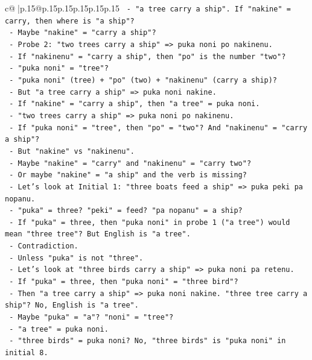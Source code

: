 \documentclass{article}
\begin{document}
{\begin{supertabular}{c@{$\;$}|p{.15\linewidth}@{}p{.15\linewidth}p{.15\linewidth}p{.15\linewidth}p{.15\linewidth}p{.15\linewidth}}
{{{\texttt{  {-} "a tree carry a ship". If "nakine" = carry, then where is "a ship"?} \\
\texttt{  {-} Maybe "nakine" = "carry a ship"?} \\
\texttt{  {-} Probe 2: "two trees carry a ship" => puka noni po nakinenu.} \\
\texttt{  {-} If "nakinenu" = "carry a ship", then "po" is the number "two"?} \\
\texttt{  {-} "puka noni" = "tree"?} \\
\texttt{  {-} "puka noni" (tree) + "po" (two) + "nakinenu" (carry a ship)?} \\
\texttt{  {-} But "a tree carry a ship" => puka noni nakine.} \\
\texttt{  {-} If "nakine" = "carry a ship", then "a tree" = puka noni.} \\
\texttt{  {-} "two trees carry a ship" => puka noni po nakinenu.} \\
\texttt{  {-} If "puka noni" = "tree", then "po" = "two"? And "nakinenu" = "carry a ship"?} \\
\texttt{  {-} But "nakine" vs "nakinenu".} \\
\texttt{  {-} Maybe "nakine" = "carry" and "nakinenu" = "carry two"?} \\
\texttt{  {-} Or maybe "nakine" = "a ship" and the verb is missing?} \\
\texttt{  {-} Let's look at Initial 1: "three boats feed a ship" => puka peki pa nopanu.} \\
\texttt{  {-} "puka" = three? "peki" = feed? "pa nopanu" = a ship?} \\
\texttt{  {-} If "puka" = three, then "puka noni" in probe 1 ("a tree") would mean "three tree"? But English is "a tree".} \\
\texttt{  {-} Contradiction.} \\
\texttt{  {-} Unless "puka" is not "three".} \\
\texttt{  {-} Let's look at "three birds carry a ship" => puka noni pa retenu.} \\
\texttt{  {-} If "puka" = three, then "puka noni" = "three bird"?} \\
\texttt{  {-} Then "a tree carry a ship" => puka noni nakine. "three tree carry a ship"? No, English is "a tree".} \\
\texttt{  {-} Maybe "puka" = "a"? "noni" = "tree"?} \\
\texttt{  {-} "a tree" = puka noni.} \\
\texttt{  {-} "three birds" = puka noni? No, "three birds" is "puka noni" in initial 8.} \\
}}}
\end{supertabular}}
\end{document}

